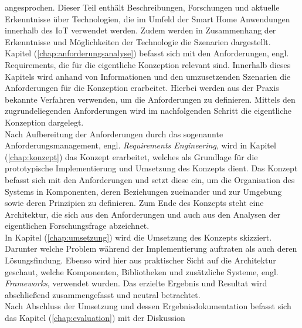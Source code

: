     angesprochen. Dieser Teil enthält Beschreibungen, Forschungen und aktuelle Erkenntnisse über Technologien, die im Umfeld der 
    Smart Home Anwendungen innerhalb des \acs{IoT} verwendet werden. Zudem werden in Zusammenhang der Erkenntnisse und 
    Möglichkeiten der Technologie die Szenarien dargestellt. 
    \\
    \linebreak
    Kapitel (\ref{chap:anforderungsanalyse}) befasst sich mit den Anforderungen, engl. Requirements, die für die 
    eigentliche Konzeption relevant sind. Innerhalb dieses Kapitels wird anhand von Informationen und den umzusetzenden 
    Szenarien die Anforderungen für die Konzeption erarbeitet. Hierbei werden aus der Praxis bekannte Verfahren verwenden, um 
    die Anforderungen zu definieren. Mittels den zugrundeliegenden Anforderungen wird im nachfolgenden Schritt die eigentliche 
    Konzeption dargelegt.
    \\
    \linebreak 
    Nach Aufbereitung der Anforderungen durch das sogenannte Anforderungsmanagement, engl. \textit{Requirements Engineering},
    wird in Kapitel (\ref{chap:konzept}) das Konzept erarbeitet, welches als Grundlage für die prototypische Implementierung und 
    Umsetzung des Konzepts dient. Das Konzept befasst sich mit den Anforderungen und setzt diese ein, um die Organisation des 
    Systems in Komponenten, deren Beziehungen zueinander und zur Umgebung sowie deren Prinzipien zu definieren. Zum Ende des 
    Konzepts steht eine Architektur, die sich aus den Anforderungen und auch aus den Analysen der eigentlichen Forschungsfrage 
    abzeichnet.
    \\
    \linebreak
    In Kapitel (\ref{chap:umsetzung}) wird die Umsetzung des Konzepts skizziert. Darunter welche Problem während der Implementierung 
    auftraten als auch deren Lösungsfindung. Ebenso wird hier aus praktischer Sicht auf die Architektur geschaut, welche Komponenten,  
    Bibliotheken und zusätzliche Systeme, engl. \textit{Frameworks}, verwendet wurden. Das erzielte Ergebnis und Resultat wird 
    abschließend zusammengefasst und neutral betrachtet.
    \\
    \linebreak
    Nach Abschluss der Umsetzung und dessen Ergebnisdokumentation befasst sich das Kapitel (\ref{chap:evaluation}) mit der Diskussion 
